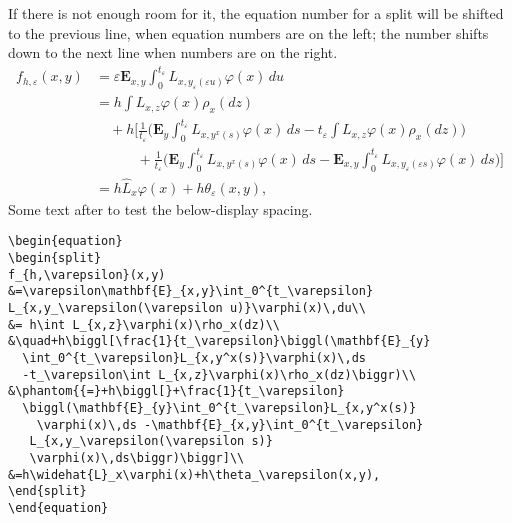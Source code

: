 \documentclass[draft]{amsart}
\newcommand{\ntt}{\normalfont\ttfamily}
\newcommand{\env}[1]{{\protect\ntt#1}}
\theoremstyle{definition}
\theoremstyle{remark}
\begin{document}
If there is not enough room for it, the equation number for  a
\env{split} will be shifted to the previous line, when equation numbers are
on the left; the number shifts down to the next line when numbers are on
the right.
\begin{equation}
\begin{split}
f_{h,\varepsilon}(x,y)
&=\varepsilon\mathbf{E}_{x,y}\int_0^{t_\varepsilon}
L_{x,y_\varepsilon(\varepsilon u)}\varphi(x)\,du\\
&= h\int L_{x,z}\varphi(x)\rho_x(dz)\\
&\quad+h\biggl[\frac{1}{t_\varepsilon}\biggl(\mathbf{E}_{y}
  \int_0^{t_\varepsilon}L_{x,y^x(s)}\varphi(x)\,ds
  -t_\varepsilon\int L_{x,z}\varphi(x)\rho_x(dz)\biggr)\\
&\phantom{{=}+h\biggl[}+\frac{1}{t_\varepsilon}
  \biggl(\mathbf{E}_{y}\int_0^{t_\varepsilon}L_{x,y^x(s)}
    \varphi(x)\,ds -\mathbf{E}_{x,y}\int_0^{t_\varepsilon}
   L_{x,y_\varepsilon(\varepsilon s)}
   \varphi(x)\,ds\biggr)\biggr]\\
&=h\widehat{L}_x\varphi(x)+h\theta_\varepsilon(x,y),
\end{split}
\end{equation}
Some text after to test the below-display spacing.

\begin{verbatim}
\begin{equation}
\begin{split}
f_{h,\varepsilon}(x,y)
&=\varepsilon\mathbf{E}_{x,y}\int_0^{t_\varepsilon}
L_{x,y_\varepsilon(\varepsilon u)}\varphi(x)\,du\\
&= h\int L_{x,z}\varphi(x)\rho_x(dz)\\
&\quad+h\biggl[\frac{1}{t_\varepsilon}\biggl(\mathbf{E}_{y}
  \int_0^{t_\varepsilon}L_{x,y^x(s)}\varphi(x)\,ds
  -t_\varepsilon\int L_{x,z}\varphi(x)\rho_x(dz)\biggr)\\
&\phantom{{=}+h\biggl[}+\frac{1}{t_\varepsilon}
  \biggl(\mathbf{E}_{y}\int_0^{t_\varepsilon}L_{x,y^x(s)}
    \varphi(x)\,ds -\mathbf{E}_{x,y}\int_0^{t_\varepsilon}
   L_{x,y_\varepsilon(\varepsilon s)}
   \varphi(x)\,ds\biggr)\biggr]\\
&=h\widehat{L}_x\varphi(x)+h\theta_\varepsilon(x,y),
\end{split}
\end{equation}
\end{verbatim}
\end{document}
